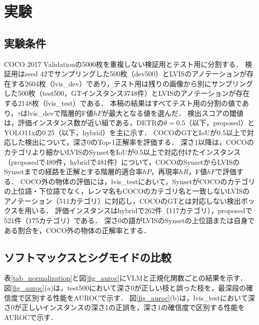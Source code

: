 \section{実験}
\subsection{実験条件}
COCO 2017 Validationの5000枚を重複しない検証用とテスト用に分割する．
検証用はseed 42でサンプリングした500枚（dev500）とLVIS\cite{ref_LVIS}のアノテーションが存在する2604枚（lvis\_dev）であり，テスト用は残りの画像から別にサンプリングした500枚（test500，GTインスタンス3748件）とLVISのアノテーションが存在する2148枚（lvis\_test）である．
本稿の結果はすべてテスト用の分割の値であり，$ \tau $はlvis\_devで階層的F値$ hF $が最大となる値を選んだ．
検出スコアの閾値は，評価インスタンス数が近い組である，DETRの$ \theta = 0.5 $（以下，proposed）とYOLO11xの0.25（以下，hybrid）を主に示す．
COCOのGTとIoUが0.5以上で対応した検出について，深さ0のTop-1正解率を評価する．
深さ1以降は，COCOのカテゴリより細かいLVISのSynsetをIoUが0.5以上で対応付けたインスタンス（proposedで489件，hybridで481件）について，COCOのSynsetからLVISのSynsetまでの経路を正解とする階層的適合率$ hP $，再現率$ hR $，F値$ hF $\cite{ref_hF}で評価する．
COCO外の物体の評価には，lvis\_testにおいて，SynsetがCOCOのカテゴリの上位語・下位語でなく，レンマ名もCOCOのカテゴリ名と一致しないLVISのアノテーション（511カテゴリ）に対応し，COCOのGTとは対応しない検出ボックスを用いる．
評価インスタンスはhybridで262件（117カテゴリ），proposedで521件（175カテゴリ）である．
深さ0の語がLVISのSynsetの上位語または自身である割合を，COCO外の物体の正解率とする．

\subsection{ソフトマックスとシグモイドの比較}
表\ref{tab_normalization}と図\ref{fig_auroc}にVLMと正規化関数ごとの結果を示す．
図\ref{fig_auroc}(a)は，test500において深さ0が正しい枝と誤った枝を，最深段の確信度で区別する性能をAUROCで示す．
図\ref{fig_auroc}(b)は，lvis\_testにおいて深さ0が正しいインスタンスの深さ1の正誤を，深さ1の確信度で区別する性能をAUROCで示す．

